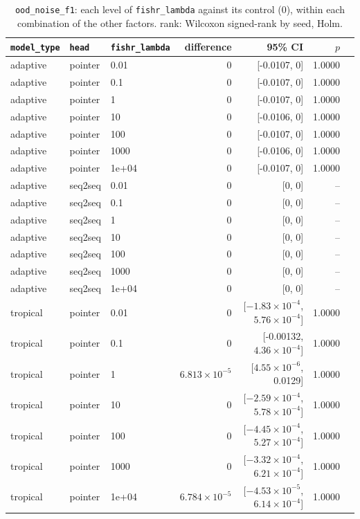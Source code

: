 \documentclass[10pt]{article}
\begin{document}
{\small
\begin{longtable}{lllrrrl}
\caption{\texttt{ood\_noise\_f1}: each level of \texttt{fishr\_lambda} against its control (0), within each combination of the other factors. rank: Wilcoxon signed-rank by seed, Holm.}\label{tab:control-ood_noise_f1}\\
\toprule
\texttt{model\_type} & \texttt{head} & \texttt{fishr\_lambda} & difference & 95\% CI & $p$ & \\
\midrule
\endhead
adaptive & pointer & 0.01 & 0 & [-0.0107, 0] & 1.0000 & \\
adaptive & pointer & 0.1 & 0 & [-0.0107, 0] & 1.0000 & \\
adaptive & pointer & 1 & 0 & [-0.0107, 0] & 1.0000 & \\
adaptive & pointer & 10 & 0 & [-0.0106, 0] & 1.0000 & \\
adaptive & pointer & 100 & 0 & [-0.0107, 0] & 1.0000 & \\
adaptive & pointer & 1000 & 0 & [-0.0106, 0] & 1.0000 & \\
adaptive & pointer & 1e+04 & 0 & [-0.0107, 0] & 1.0000 & \\
adaptive & seq2seq & 0.01 & 0 & [0, 0] & -- & \\
adaptive & seq2seq & 0.1 & 0 & [0, 0] & -- & \\
adaptive & seq2seq & 1 & 0 & [0, 0] & -- & \\
adaptive & seq2seq & 10 & 0 & [0, 0] & -- & \\
adaptive & seq2seq & 100 & 0 & [0, 0] & -- & \\
adaptive & seq2seq & 1000 & 0 & [0, 0] & -- & \\
adaptive & seq2seq & 1e+04 & 0 & [0, 0] & -- & \\
tropical & pointer & 0.01 & 0 & [$-1.83\times10^{-4}$, $5.76\times10^{-4}$] & 1.0000 & \\
tropical & pointer & 0.1 & 0 & [-0.00132, $4.36\times10^{-4}$] & 1.0000 & \\
tropical & pointer & 1 & $6.813\times10^{-5}$ & [$4.55\times10^{-6}$, 0.0129] & 1.0000 & \\
tropical & pointer & 10 & 0 & [$-2.59\times10^{-4}$, $5.78\times10^{-4}$] & 1.0000 & \\
tropical & pointer & 100 & 0 & [$-4.45\times10^{-4}$, $5.27\times10^{-4}$] & 1.0000 & \\
tropical & pointer & 1000 & 0 & [$-3.32\times10^{-4}$, $6.21\times10^{-4}$] & 1.0000 & \\
tropical & pointer & 1e+04 & $6.784\times10^{-5}$ & [$-4.53\times10^{-5}$, $6.14\times10^{-4}$] & 1.0000 & \\

\end{longtable}}
\end{document}
